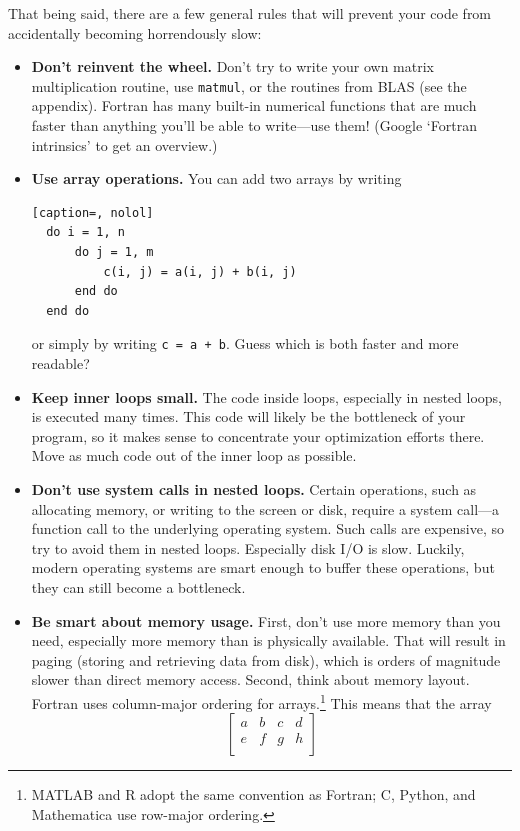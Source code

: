 \documentclass[openany,oneside]{report}
\begin{document}
That being said, there are a few general rules that will prevent your code from accidentally becoming horrendously slow:
\begin{itemize}
  \item\textbf{Don't reinvent the wheel.} Don't try to write your own matrix multiplication routine, use \texttt{matmul}, or the routines from BLAS (see the  appendix).
    Fortran has many built-in numerical functions that are much faster than anything you'll be able to write---use them! (Google `Fortran intrinsics' to get an overview.)
  \item\textbf{Use array operations.} You can add two arrays by writing
\begin{lstlisting}[caption=, nolol]
  do i = 1, n
      do j = 1, m
          c(i, j) = a(i, j) + b(i, j)
      end do
  end do
\end{lstlisting}
or simply by writing \texttt{c = a + b}.
Guess which is both faster and more readable?
  \item\textbf{Keep inner loops small.} The code inside loops, especially in nested loops, is executed many times.
    This code will likely be the bottleneck of your program, so it makes sense to concentrate your optimization efforts there.
    Move as much code out of the inner loop as possible.
  \item\textbf{Don't use system calls in nested loops.} Certain operations, such as allocating memory, or writing to the screen or disk, require a system call---a function call to the underlying operating system.
    Such calls are expensive, so try to avoid them in nested loops.
    Especially disk I/O is slow.
    Luckily, modern operating systems are smart enough to buffer these operations, but they can still become a bottleneck.
  \item\textbf{Be smart about memory usage.} First, don't use more memory than you need, especially more memory than is physically available.
    That will result in paging (storing and retrieving data from disk), which is orders of magnitude slower than direct memory access.
    Second, think about memory layout.
    Fortran uses column-major ordering for arrays.\footnote{MATLAB and R adopt the same convention as Fortran; C, Python, and Mathematica use row-major ordering.}
    This means that the array
    \begin{equation*}
    \begin{bmatrix}
        a & b & c & d \\
        e & f & g & h \\

\end{bmatrix}
\end{equation*}
\end{itemize}
\end{document}
